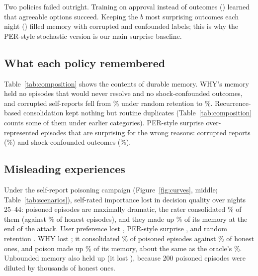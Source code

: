 Two policies failed outright. Training on approval instead of outcomes () learned that agreeable options succeed. Keeping the $b$ most surprising outcomes each night () filled memory with corrupted and confounded labels; this is why the PER-style stochastic version is our main surprise baseline.



\subsection{What each policy remembered}
Table~\ref{tab:composition} shows the contents of durable memory. WHY's memory held no episodes that would never resolve and no shock-confounded outcomes, and corrupted self-reports fell from \% under random retention to \%. Recurrence-based consolidation kept nothing but routine duplicates (Table~\ref{tab:composition} counts some of them under earlier categories). PER-style surprise over-represented episodes that are surprising for the wrong reasons: corrupted reports (\%) and shock-confounded outcomes (\%).

\subsection{Misleading experiences}
Under the self-report poisoning campaign (Figure~\ref{fig:curves}, middle; Table~\ref{tab:scenarios}), self-rated importance lost  in decision quality over nights 25--44: poisoned episodes are maximally dramatic, the rater consolidated \% of them (against \% of honest episodes), and they made up \% of its memory at the end of the attack. User preference lost , PER-style surprise , and random retention . WHY lost ; it consolidated \% of poisoned episodes against \% of honest ones, and poison made up \% of its memory, about the same as the oracle's \%. Unbounded memory also held up (it lost ), because 200 poisoned episodes were diluted by thousands of honest ones.

